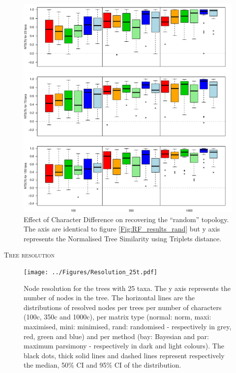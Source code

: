 \documentclass[12pt,letterpaper]{article}
\renewcommand{\section}[1]{%
\bigskip
\begin{center}
\begin{Large}
\normalfont\scshape #1
\medskip
\end{Large}
\end{center}}
\begin{document}
\begin{figure}[!htbp]
\centering
   \includegraphics[width=1\textwidth]{../Figures/Tr_results_null.pdf}
\caption{Effect of Character Difference on recovering the ``random'' topology. The axis are identical to figure \ref{Fig:RF_results_rand} but y axis represents the Normalised Tree Similarity using Triplets distance.}
\label{Fig:Tr_results_rand}
\end{figure}

\newpage

\section{Tree resolution}

\begin{figure}[!htbp]
\centering
   \texttt{[image: ../Figures/Resolution\_25t.pdf]}
\caption{Node resolution for the trees with 25 taxa. The y axis represents the number of nodes in the tree. The horizontal lines are the distributions of resolved nodes per trees per number of characters (100c, 350c and 1000c), per matrix type (normal: norm, maxi: maximised, mini: minimised, rand: randomised - respectively in grey, red, green and blue) and per method (bay: Bayesian and par: maximum parsimony - respectively in dark and light colours). The black dots, thick solid lines and dashed lines represent respectively the median, 50\% CI and 95\% CI of the distribution.}
\label{Fig:Resolution_25t}
\end{figure}
\end{document}
